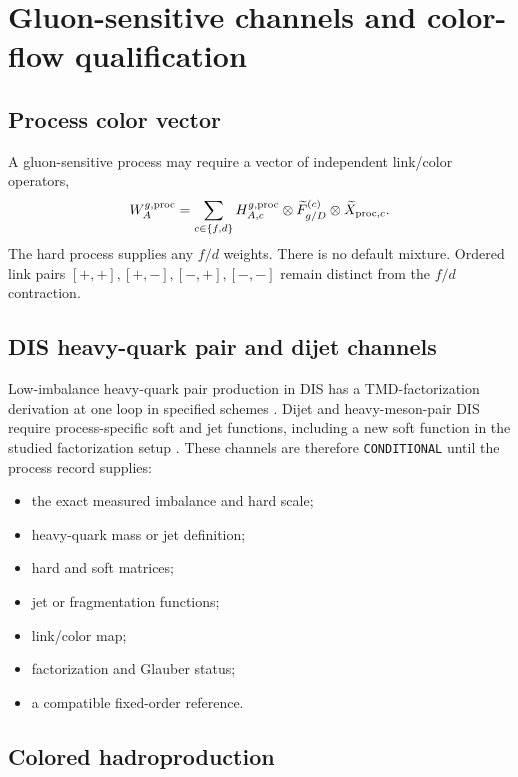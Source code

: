 \documentclass[11pt]{article}
\begin{document}
\section{Gluon-sensitive channels and color-flow qualification}
\label{sec:gluon}

\subsection{Process color vector}

A gluon-sensitive process may require a vector of independent link/color operators,
\begin{equation}
 W_A^{g,{\rm proc}}
 =\sum_{c\in\{f,d\}}
 H_{A,c}^{g,{\rm proc}}
 \otimes
 \widetilde F_{g/D}^{(c)}
 \otimes
 \widetilde X_{{\rm proc},c}.
 \label{eq:gluon-color-vector}
\end{equation}
The hard process supplies any \(f/d\) weights.  There is no default mixture.  Ordered link pairs \([+,+],[+,-],[-,+],[-,-]\) remain distinct from the \(f/d\) contraction.

\subsection{DIS heavy-quark pair and dijet channels}

Low-imbalance heavy-quark pair production in DIS has a TMD-factorization derivation at one loop in specified schemes \cite{ZhuSunYuan2013}.  Dijet and heavy-meson-pair DIS require process-specific soft and jet functions, including a new soft function in the studied factorization setup \cite{DelCastilloEtAl2020}.  These channels are therefore \texttt{CONDITIONAL} until the process record supplies:
\begin{itemize}
\item the exact measured imbalance and hard scale;
\item heavy-quark mass or jet definition;
\item hard and soft matrices;
\item jet or fragmentation functions;
\item link/color map;
\item factorization and Glauber status;
\item a compatible fixed-order reference.
\end{itemize}

\subsection{Colored hadroproduction}
\end{document}
